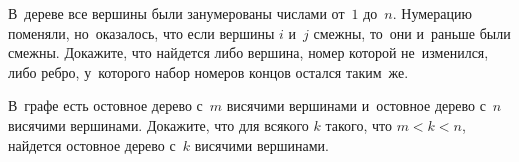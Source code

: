 \begin{problems}
\item
В~дереве все вершины были занумерованы числами от~$1$ до~$n$.
Нумерацию поменяли, но~оказалось, что если вершины $i$ и~$j$ смежны, то~они
и~раньше были смежны.
Докажите, что найдется либо вершина, номер которой не~изменился, либо ребро,
у~которого набор номеров концов остался таким~же.

\item
В~графе есть остовное дерево с~$m$ висячими вершинами и~остовное дерево с~$n$
висячими вершинами.
Докажите, что для всякого $k$ такого, что $m < k < n$, найдется остовное дерево
с~$k$ висячими вершинами.




\end{problems}

